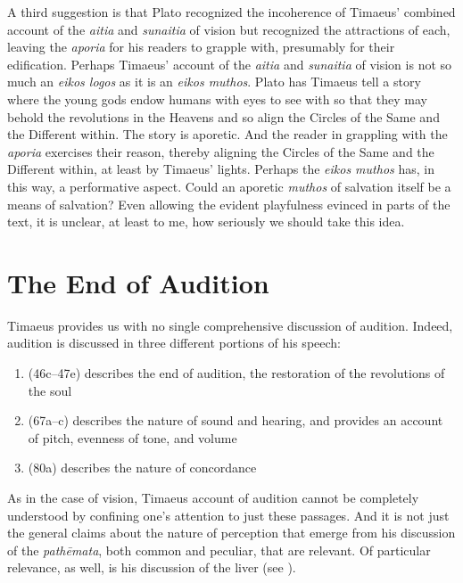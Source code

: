 A third suggestion is that Plato recognized the incoherence of Timaeus' combined account of the \emph{aitia} and \emph{sunaitia} of vision but recognized the attractions of each, leaving the \emph{aporia} for his readers to grapple with, presumably for their edification. Perhaps Timaeus' account of the \emph{aitia} and \emph{sunaitia} of vision is not so much an \emph{eikos logos} as it is an \emph{eikos muthos}. Plato has Timaeus tell a story where the young gods endow humans with eyes to see with so that they may behold the revolutions in the Heavens and so align the Circles of the Same and the Different within. The story is aporetic. And the reader in grappling with the \emph{aporia} exercises their reason, thereby aligning the Circles of the Same and the Different within, at least by Timaeus' lights. Perhaps the \emph{eikos muthos} has, in this way, a performative aspect. Could an aporetic \emph{muthos} of salvation itself be a means of salvation? Even allowing the evident playfulness evinced in parts of the text, it is unclear, at least to me, how seriously we should take this idea.



\section{The End of Audition} %
\label{sec:the_end_of_audition}

Timaeus provides us with no single comprehensive discussion of audition. Indeed, audition is discussed in three different portions of his speech:
\begin{enumerate}[(1)]
	\item (46c–47e) describes the end of audition, the restoration of the revolutions of the soul
	\item (67a–c) describes the nature of sound and hearing, and provides an account of pitch, evenness of tone, and volume
	\item (80a) describes the nature of concordance
\end{enumerate}
As in the case of vision, Timaeus account of audition cannot be completely understood by confining one's attention to just these passages. And it is not just the general claims about the nature of perception that emerge from his discussion of the \emph{pathēmata}, both common and peculiar, that are relevant. Of particular relevance, as well, is his discussion of the liver (see \citealt{Barker:2000dy}).

